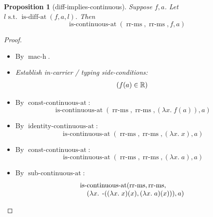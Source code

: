 \documentclass[11pt]{article}
\theoremstyle{plain}
\newtheorem{proposition}{Proposition}
\begin{document}
\begin{proposition}[diff-implies-continuous]
Suppose $f, a$. Let $l \text{ s.t. } \operatorname{is\text{-}diff\text{-}at}(f, a, l)$. Then
\begin{equation*}
\operatorname{is\text{-}continuous\text{-}at}(\operatorname{rr\text{-}ms}, \operatorname{rr\text{-}ms}, f, a)
\end{equation*}

\end{proposition}

\begin{proof}
\begin{itemize}[leftmargin=2.8em, itemsep=4pt, parsep=1pt]
  \item[\textbf{3}] By $\operatorname{mac\text{-}h}$.
  \item[\textbf{4--11}] \emph{Establish in-carrier / typing side-conditions:}
\begin{equation*}
\begin{array}{@{}l@{}}
(f(a) \in \mathbb{R})
\end{array}
\end{equation*}

  \item[\textbf{12}] By $\operatorname{const\text{-}continuous\text{-}at}$:
\begin{equation*}
\operatorname{is\text{-}continuous\text{-}at}(\operatorname{rr\text{-}ms}, \operatorname{rr\text{-}ms}, (\lambda x.\; f(a)), a)
\end{equation*}

  \item[\textbf{13}] By $\operatorname{identity\text{-}continuous\text{-}at}$:
\begin{equation*}
\operatorname{is\text{-}continuous\text{-}at}(\operatorname{rr\text{-}ms}, \operatorname{rr\text{-}ms}, (\lambda x.\; x), a)
\end{equation*}

  \item[\textbf{14}] By $\operatorname{const\text{-}continuous\text{-}at}$:
\begin{equation*}
\operatorname{is\text{-}continuous\text{-}at}(\operatorname{rr\text{-}ms}, \operatorname{rr\text{-}ms}, (\lambda x.\; a), a)
\end{equation*}

  \item[\textbf{15}] By $\operatorname{sub\text{-}continuous\text{-}at}$:
\begin{equation*}
\begin{array}{@{}l@{}} \operatorname{is\text{-}continuous\text{-}at}(\operatorname{rr\text{-}ms}, \operatorname{rr\text{-}ms}, \\ \quad (\lambda x.\; \operatorname{\text{-}}((\lambda x.\; x)(x), (\lambda x.\; a)(x))), a) \end{array}
\end{equation*}


\end{itemize}
\end{proof}
\end{document}
